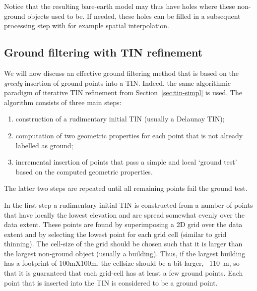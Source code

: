%

Notice that the resulting bare-earth model may thus have holes where these non-ground objects used to be.
If needed, these holes can be filled in a subsequent processing step with for example spatial interpolation.

%
\subsection{Ground filtering with TIN refinement}%

We will now discuss an effective ground filtering method that is based on the \emph{greedy} insertion of ground points into a TIN\@.
Indeed, the same algorithmic paradigm of iterative TIN refinement from Section~\ref{sec:tin-simpl} is used.
The algorithm consists of three main steps:
\begin{enumerate}
  \item construction of a rudimentary initial TIN (usually a Delaunay TIN);
  \item computation of two geometric properties for each point that is not already labelled as ground;
  \item incremental insertion of points that pass a simple and local `ground test' based on the computed geometric properties.
\end{enumerate}
The latter two steps are repeated until all remaining points fail the ground test.

In the first step a rudimentary initial TIN is constructed from a number of points that have locally the lowest elevation and are spread somewhat evenly over the data extent.
These points are found by superimposing a 2D grid over the data extent and by selecting the lowest point for each grid cell (similar to grid thinning).
The cell-size of the grid should be chosen such that it is larger than the largest non-ground object (usually a building).
Thus, if the largest building has a footprint of 100mX100m, the cellsize should be a bit larger, \eg\ \qty{110}{m}, so that it is guaranteed that each grid-cell has at least a few ground points.
Each point that is inserted into the TIN is considered to be a ground point.

